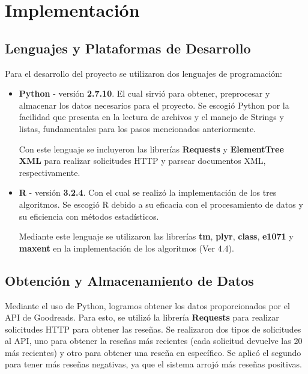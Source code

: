 \documentclass[hidelinks]{sig-alternate-05-2015}
\begin{document}
\section{Implementación}

\subsection{Lenguajes y Plataformas de Desarrollo}

Para el desarrollo del proyecto se utilizaron dos lenguajes de programación:

\begin{itemize}
	\item \textbf{Python} - versión \textbf{2.7.10}. El cual sirvió para obtener, preprocesar y almacenar los datos necesarios para el proyecto. Se escogió Python por la facilidad que presenta en la lectura de archivos y el manejo de Strings y listas, fundamentales para los pasos mencionados anteriormente.
    
    Con este lenguaje se incluyeron las librerías \textbf{Requests} y \textbf{ElementTree XML} para realizar solicitudes HTTP y parsear documentos XML, respectivamente.
    
    \item \textbf{R} - versión \textbf{3.2.4}. Con el cual se realizó la implementación de los tres algoritmos. Se escogió R debido a su eficacia con el procesamiento de datos y su eficiencia con métodos estadísticos. 
    
    Mediante este lenguaje se utilizaron las librerías \textbf{tm}, \textbf{plyr}, \textbf{class}, \textbf{e1071} y \textbf{maxent} en la implementación de los algoritmos (Ver 4.4).
   
    
\end{itemize}

\subsection{Obtención y Almacenamiento de Datos}
Mediante el uso de Python, logramos obtener los datos proporcionados por el API de Goodreads. Para esto, se utilizó la librería \textbf{Requests} para realizar solicitudes HTTP para obtener las reseñas. Se realizaron dos tipos de solicitudes al API, uno para obtener la reseñas más recientes (cada solicitud devuelve las 20 más recientes) y otro para obtener una reseña en específico. Se aplicó el segundo para tener más reseñas negativas, ya que el sistema arrojó más reseñas positivas.
\end{document}
